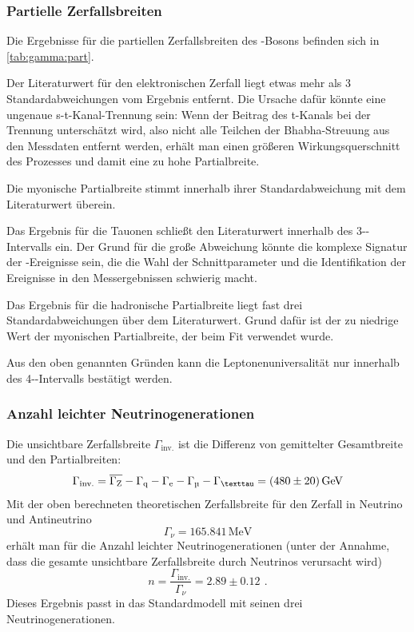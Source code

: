 \subsubsection{Partielle Zerfallsbreiten}
\label{subsub:partWidth}
Die Ergebnisse für die partiellen Zerfallsbreiten des \Z-Bosons befinden sich in \autoref{tab:gamma:part}.

Der Literaturwert für den elektronischen Zerfall liegt etwas mehr als 3 Standardabweichungen vom Ergebnis entfernt.
Die Ursache dafür könnte eine ungenaue s-t-Kanal-Trennung sein:
Wenn der Beitrag des t-Kanals bei der Trennung unterschätzt wird,
also nicht alle Teilchen der Bhabha-Streuung aus den Messdaten entfernt werden,
erhält man einen größeren Wirkungsquerschnitt des Prozesses und damit eine zu hohe Partialbreite.

Die myonische Partialbreite stimmt innerhalb ihrer Standardabweichung mit dem Literaturwert überein.

Das Ergebnis für die Tauonen schließt den Literaturwert innerhalb des 3-\textsigma-Intervalls ein.
Der Grund für die große Abweichung könnte die komplexe Signatur der \texttau-Ereignisse sein,
die die Wahl der Schnittparameter und die Identifikation der Ereignisse in den Messergebnissen schwierig macht.

Das Ergebnis für die hadronische Partialbreite liegt fast drei Standardabweichungen über dem Literaturwert.
Grund dafür ist der zu niedrige Wert der myonischen Partialbreite, der beim Fit verwendet wurde.

Aus den oben genannten Gründen kann die Leptonenuniversalität nur innerhalb des 4-\textsigma-Intervalls
bestätigt werden.



\subsubsection{Anzahl leichter Neutrinogenerationen}
Die unsichtbare Zerfallsbreite $\Gamma_\text{inv.}$ ist die
Differenz von gemittelter Gesamtbreite und den Partialbreiten:
\begin{equation}
  \Gamma_\text{inv.}=\overline{\Gamma_\text{Z}}-\Gamma_\text{q}-\Gamma_\text{e}-\Gamma_\text{\textmu}-\Gamma_\text{\texttau}
  =(480 \pm 20)\,\text{GeV}
\end{equation}
Mit der oben berechneten theoretischen Zerfallsbreite für den Zerfall in Neutrino und Antineutrino
\begin{equation}
  \Gamma_\nu=165.841\,\text{MeV}
\end{equation}
erhält man für die Anzahl leichter Neutrinogenerationen
(unter der Annahme, dass die gesamte unsichtbare Zerfallsbreite durch Neutrinos verursacht wird)
\begin{equation}
  n=\frac{\Gamma_\text{inv.}}{\Gamma_\nu}=2.89 \pm 0.12 \ \, .
\end{equation}
Dieses Ergebnis passt in das Standardmodell mit seinen drei Neutrinogenerationen.

